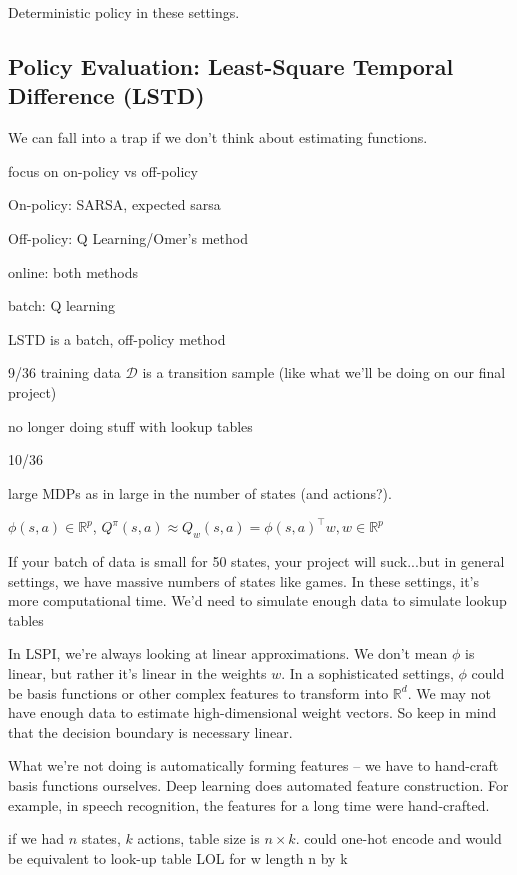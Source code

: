 \documentclass[11pt]{article}
\begin{document}
Deterministic policy in these settings.

\subsection{Policy Evaluation: Least-Square Temporal Difference (LSTD)}

We can fall into a trap if we don't think about estimating functions.

focus on on-policy vs off-policy

On-policy: SARSA, expected sarsa

Off-policy: Q Learning/Omer's method

online: both methods

batch: Q learning


LSTD is a batch, off-policy method

9/36 
training data $\mathcal{D}$ is a transition sample (like what we'll be doing on our final project)

no longer doing stuff with lookup tables

10/36

large MDPs as in large in the number of states (and actions?).

$\phi(s, a) \in \mathbb{R}^p$, $Q^\pi(s, a) \approx Q_w(s, a) = \phi(s, a)^\top w, w \in \mathbb{R}^p$

If your batch of data is small for 50 states, your project will suck...but in general settings, we have massive numbers of states like games. In these settings, it's more computational time. We'd need to simulate enough data to simulate lookup tables

In LSPI, we're always looking at linear approximations. We don't mean $\phi$ is linear, but rather it's linear in the weights $w$. In a sophisticated settings, $\phi$ could be basis functions or other complex features to transform into $\mathbb{R}^d$. We may not have enough data to estimate high-dimensional weight vectors. So keep in mind that the decision boundary is necessary linear.

What we're not doing is automatically forming features -- we have to hand-craft basis functions ourselves. Deep learning does automated feature construction. For example, in speech recognition, the features for a long time were hand-crafted.

if we had $n$ states, $k$ actions, table size is $n \times k$. could one-hot encode and would be equivalent to look-up table LOL for w length n by k
\end{document}
